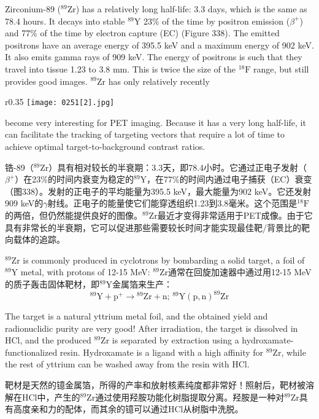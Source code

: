 \documentclass[dvipsnames, svgnames,a4paper,11pt]{article}
\begin{document}
Zirconium-89 (\(\mathrm{^{89}Zr}\)) has a relatively long half-life: 3.3 days, which is the same as 78.4 hours. It decays into stable \(\mathrm{^{89}Y}\) 23\% of the time by positron emission (\(\beta^+\)) and 77\% of the time by electron capture (EC) (Figure 338). The emitted positrons have an average energy of 395.5 keV and a maximum energy of 902 keV. It also emits gamma rays of 909 keV. The energy of positrons is such that they travel into tissue 1.23 to 3.8 mm. This is twice the size of the \(\mathrm{^{18}F}\) range, but still provides good images. \(\mathrm{^{89}Zr}\) has only relatively recently
\begin{wrapfigure}{r}{0.35\textwidth}
    \centering
    \texttt{[image: 0251[2].jpg]}
     \label{fig338}
\end{wrapfigure}
become very interesting for PET imaging. Because it has a very long half-life, it can facilitate the tracking of targeting vectors that require a lot of time to achieve optimal target-to-background contrast ratios.  

锆-89（\(\mathrm{^{89}Zr}\)）具有相对较长的半衰期：3.3天，即78.4小时。它通过正电子发射（\(\beta^+\)）在23\%的时间内衰变为稳定的\(\mathrm{^{89}Y}\)，在77\%的时间内通过电子捕获（EC）衰变（图338）。发射的正电子的平均能量为395.5 keV，最大能量为902 keV。它还发射909 keV的$\gamma$射线。正电子的能量使它们能穿透组织1.23到3.8毫米。这个范围是\(\mathrm{^{18}F}\)的两倍，但仍然能提供良好的图像。\(\mathrm{^{89}Zr}\)最近才变得非常适用于PET成像。由于它具有非常长的半衰期，它可以促进那些需要较长时间才能实现最佳靶/背景比的靶向载体的追踪。  

\(\mathrm{^{89}Zr}\) is commonly produced in cyclotrons by bombarding a solid target, a foil of \(\mathrm{^{89}Y}\) metal, with protons of 12-15 MeV:  
\(\mathrm{^{89}Zr}\)通常在回旋加速器中通过用12-15 MeV的质子轰击固体靶材，即\(\mathrm{^{89}Y}\)金属箔来生产：  
\[
\mathrm{^{89}Y + p^+ \rightarrow {}^{89}Zr + n; \, ^{89}Y(p,n)^{89}Zr}
\]  

The target is a natural yttrium metal foil, and the obtained yield and radionuclidic purity are very good! After irradiation, the target is dissolved in HCl, and the produced \(\mathrm{^{89}Zr}\) is separated by extraction using a hydroxamate-functionalized resin. Hydroxamate is a ligand with a high affinity for \(\mathrm{^{89}Zr}\), while the rest of yttrium can be washed away from the resin with HCl.

靶材是天然的镱金属箔，所得的产率和放射核素纯度都非常好！照射后，靶材被溶解在HCl中，产生的\(\mathrm{^{89}Zr}\)通过使用羟胺功能化树脂提取分离。羟胺是一种对\(\mathrm{^{89}Zr}\)具有高度亲和力的配体，而其余的镱可以通过HCl从树脂中洗脱。
\end{document}
